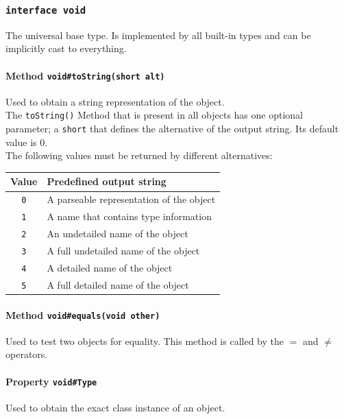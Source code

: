 \documentclass{docs}
\begin{document}
    \label{typeVoid}
    \subsubsection{\texttt{interface void}}
    The universal base type. Is implemented by all built-in types and can be implicitly cast to everything.

    \label{methodVoidToString}
    \paragraph{Method \texttt{void\#toString(short alt)}}
    Used to obtain a string representation of the object.
    \\
    The \texttt{toString()} Method that is present in all objects has one optional parameter; a \texttt{short} that defines the alternative of the output string. Its default value is 0.
    \\
    The following values must be returned by different alternatives:
    \begin{center}
    \begin{tabular}{c|l}
        Value & Predefined output string \\
        \hline
        \texttt{0} & A parseable representation of the object \\
        \texttt{1} & A name that contains type information \\
        \texttt{2} & An undetailed name of the object \\
        \texttt{3} & A full undetailed name of the object \\
        \texttt{4} & A detailed name of the object \\
        \texttt{5} & A full detailed name of the object
    \end{tabular}
    \end{center}

    \label{methodVoidEquals}
    \paragraph{Method \texttt{void\#equals(void other)}}
    Used to test two objects for equality.
    This method is called by the \begin{math}=\end{math} and \begin{math}\neq\end{math} operators.

    \label{propVoidType}
    \paragraph{Property \texttt{void\#Type}}
    Used to obtain the exact class instance of an object.
\end{document}
